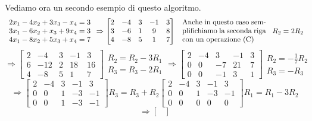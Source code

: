 \begin{example}
Vediamo ora un secondo esempio di questo algoritmo.
\[
    \begin{array}{l}
    2x_1 - 4x_2 + 3x_3 - x_4 = 3\\
    3x_1 - 6x_2 + x_3 + 9x_4 = 3\\
    4x_1 - 8x_2 + 5x_3 + x_4 = 7
    \end{array}
    \Rightarrow
    \begin{bmatrix}
    2 & -4 & 3 & -1 & 3\\
    3 & -6 & 1 & 9 & 8\\
    4 & -8 & 5 & 1 & 7
    \end{bmatrix}
    \hspace{.3cm}
    \parbox{4cm}{Anche in questo caso semplifichiamo la seconda riga con un operazione (C)}
    \hspace{.3cm}
    R_2 = 2R_2
\]
\[
    \Rightarrow
    \begin{bmatrix}
    2 & -4 & 3 & -1 & 3\\
    6 & -12 & 2 & 18 & 16\\
    4 & -8 & 5 & 1 & 7
    \end{bmatrix}
    \begin{array}{l}
    R_2 = R_2 - 3R_1\\
    R_3 = R_3 - 2R_1
    \end{array}
    \Rightarrow
    \begin{bmatrix}
    2 & -4 & 3 & -1 & 3\\
    0 & 0 & -7 & 21 & 7\\
    0 & 0 & -1 & 3 & 1
    \end{bmatrix}
    \begin{array}{l}
    R_2 = -\frac{1}{7}R_2\\
    R_3 = -R_3
    \end{array}
\]
\[
    \Rightarrow
    \begin{bmatrix}
    2 & -4 & 3 & -1 & 3\\
    0 & 0 & 1 & -3 & -1\\
    0 & 0 & 1 & -3 & -1
    \end{bmatrix}
    R_3 = R_3 + R_2
    \begin{bmatrix}
    2 & -4 & 3 & -1 & 3\\
    0 & 0 & 1 & -3 & -1\\
    0 & 0 & 0 & 0 & 0
    \end{bmatrix}
    R_1 = R_1 - 3R_2
\]
\[
    \Rightarrow
    \begin{bmatrix}

\end{bmatrix}\]
\end{example}

